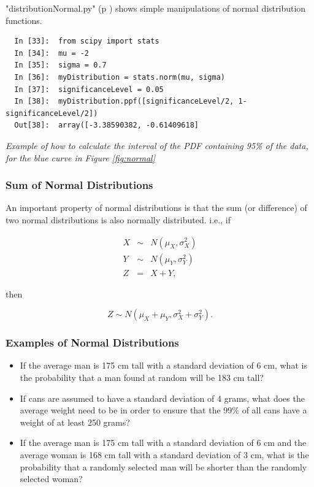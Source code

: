 \vspace{5 mm}

\PyImg "distributionNormal.py" (p \pageref{py:distributionNormal}) shows simple manipulations of normal distribution functions.

\begin{lstlisting}
  In [33]:  from scipy import stats
  In [34]:  mu = -2
  In [35]:  sigma = 0.7
  In [36]:  myDistribution = stats.norm(mu, sigma)
  In [37]:  significanceLevel = 0.05
  In [38]:  myDistribution.ppf([significanceLevel/2, 1-significanceLevel/2])
  Out[38]:  array([-3.38590382, -0.61409618]
\end{lstlisting}
\emph{Example of how to calculate the interval of the PDF containing 95\% of the data, for the blue curve in Figure \ref{fig:normal}}

\subsubsection{Sum of Normal Distributions}

An important property of normal distributions is that the sum (or difference) of two normal distributions is also normally distributed. i.e., if

\begin{eqnarray*}
    X &\sim& N(\mu_X, \sigma_X^2) \\
    Y &\sim& N(\mu_Y, \sigma_Y^2) \\
    Z &=& X + Y,
\end{eqnarray*}

then

\begin{equation}\label{eq:sumOfGaussians}
    Z \sim N(\mu_X + \mu_Y, \sigma_X^2 + \sigma_Y^2).
\end{equation}

\subsubsection{Examples of Normal Distributions}

\begin{itemize}
    \item If the average man is 175 cm tall with a standard deviation of 6 cm, what is the probability that a man found at random will be 183 cm tall?
    \item If cans are assumed to have a standard deviation of 4 grams, what does the average weight need to be in order to ensure that the 99\% of all cans have a weight of at least 250 grams?
   \item If the average man is 175 cm tall with a standard deviation of 6 cm and the average woman is 168 cm tall with a standard deviation of 3 cm, what is the probability that a randomly selected man will be shorter than the randomly selected woman?
\end{itemize}


